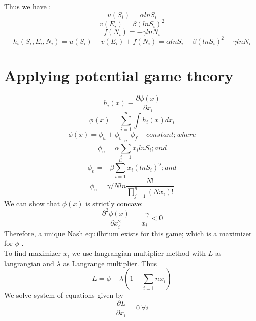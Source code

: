 \documentclass[letterpaper,english,12pt]{article}
\begin{document}
\begin{itemize}
\end{itemize}
Thus we have :
\begin{equation}
    u(S_i) = \alpha ln S_i
\end{equation}
\begin{equation}
    v(E_i) = \beta (ln S_i)^2
\end{equation}
\begin{equation}
f(N_i) = - \gamma ln N_i
\end{equation}
\begin{equation}\label{utility}
 h_i(S_i,E_i,N_i) = u(S_i) - v(E_i) + f(N_i)= \alpha ln S_i - \beta (ln S_i)^2 - \gamma ln N_i
 \end{equation}
\section{Applying potential game theory}
\begin{equation}
    h_i(x) \equiv  \frac{\partial\phi(x)}{\partial x_i}
\end{equation}
\begin{equation} \label{potential}
    \phi(x) = \sum_{i=1}^{n}\int{}{}h_i(x)dx_i
\end{equation}
\begin{equation}
    \phi(x) = \phi_u + \phi_v + \phi_f + constant ; where
\end{equation}
\begin{equation}
    \phi_u = \alpha \sum_{i=1}^{n}x_i lnS_i ;and
\end{equation}
\begin{equation}
    \phi_v = -\beta \sum_{i=1}^{n} x_i(ln S_i)^2 ; and
\end{equation}
\begin{equation}
    \phi_v = \gamma/N ln \frac{N!}{\prod_{j=1}^{n}(Nx_i)!}
\end{equation}
We can show that $\phi(x)$ is strictly concave: 
\begin{equation}
    \dfrac{\partial^2 \phi(x)}{\partial x_i^2}= \dfrac{-\gamma}{x_i}<0
\end{equation}
Therefore, a unique Nash equilbrium exists for this game; which is a maximizer for $\phi$ . \\
To find maximizer $x_i$
we use langrangian multiplier method with $L$ as langrangian and $\lambda$ as Langrange multiplier. Thus 
\begin{equation}
     L=\phi + \lambda(1-\sum_{i=1}{n}x_i)
\end{equation}
We solve system of equations given by
\begin{equation}
     \frac{\partial L}{\partial x_i} =0 ~ \forall i
 \end{equation}
 
\end{document}
